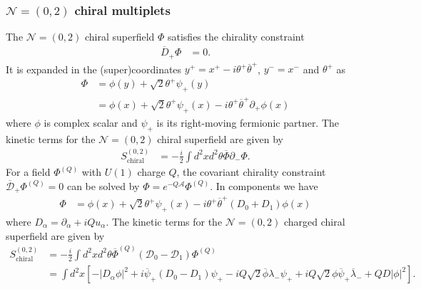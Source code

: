 \documentclass{article}
\numberwithin{equation}{section}
\begin{document}
\subsubsection{$\mathcal{N}=(0,2)$ chiral multiplets}
The $\mathcal{N}=(0,2)$ chiral superfield $\Phi$ satisfies the chirality constraint 
\begin{align}
\label{02_ch1}
\overline{D}_{+}\Phi&=0. 
\end{align}
It is expanded in the (super)coordinates $y^{+}=x^{+}-i\theta^{+}\overline{\theta}^{+}$, $y^{-}=x^{-}$ and $\theta^{+}$ as
\begin{align}
\label{02_ch2}
\Phi&=\phi(y)+\sqrt{2}\theta^{+}\psi_{+}(y)\nonumber\\
&=\phi(x)+\sqrt{2}\theta^{+}\psi_{+}(x)-i\theta^{+}\overline{\theta}^{+}\partial_{+}\phi(x)
\end{align} 
where $\phi$ is complex scalar and $\psi_{+}$ is its right-moving fermionic partner. 
The kinetic terms for the $\mathcal{N}=(0,2)$ chiral superfield are given by
\begin{align}
\label{02_ch_A1}
S_{\mathrm{chiral}}^{(0,2)}&=-\frac{i}{2}\int d^{2}x d^{2}\theta 
\overline{\Phi}\partial_{-}\Phi. 
\end{align}
For a field $\Phi^{(Q)}$ with $U(1)$ charge $Q$, the covariant chirality constraint $\overline{\mathcal{D}}_{+}\Phi^{(Q)}=0$ 
can be solved by $\Phi=e^{-Q\mathcal{A}}\Phi^{(Q)}$. 
In components we have 
\begin{align}
\label{02_ch2a}
\Phi&=\phi(x)+\sqrt{2}\theta^{+}\psi_{+}(x)-i\theta^{+}\overline{\theta}^{+}(D_{0}+D_{1})\phi(x)
\end{align}
where $D_{\alpha}=\partial_{\alpha}+iQu_{\alpha}$. 
The kinetic terms for the $\mathcal{N}=(0,2)$ charged chiral superfield are given by
\begin{align}
\label{02_ch_A2}
S_{\mathrm{chiral}}^{(0,2)}
&=-\frac{i}{2}\int d^{2}x d^{2}\theta \overline{\Phi}^{(Q)}\left(\mathcal{D}_{0}-\mathcal{D}_{1}\right)\Phi^{(Q)}
\nonumber\\
&=\int d^{2}x \left[
-|D_{\alpha}\phi|^{2}+i\overline{\psi}_{+}\left(D_{0}-D_{1}\right)\psi_{+}
-iQ\sqrt{2}\overline{\phi}\lambda_{-}\psi_{+}+iQ\sqrt{2}\phi\overline{\psi}_{+}\overline{\lambda}_{-}+QD|\phi|^{2}
\right]. 
\end{align}
\end{document}
